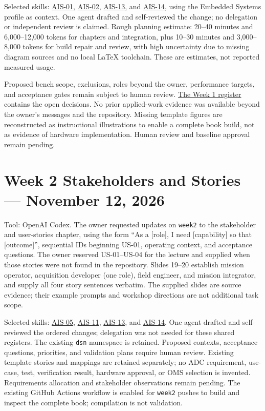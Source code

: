 Selected skills: \hyperref[Skill:AIS-01]{AIS-01},
\hyperref[Skill:AIS-02]{AIS-02}, \hyperref[Skill:AIS-13]{AIS-13}, and
\hyperref[Skill:AIS-14]{AIS-14}, using the Embedded Systems profile as context.
One agent drafted and self-reviewed the change; no delegation or independent
review is claimed. Rough planning estimate: 20--40 minutes and 6,000--12,000
tokens for chapters and integration, plus 10--30 minutes and 3,000--8,000
tokens for build repair and review, with high uncertainty due to missing
diagram sources and no local LaTeX toolchain. These are estimates, not
reported measured usage.

Proposed bench scope, exclusions, roles beyond the owner, performance targets,
and acceptance gates remain subject to human review.
\hyperref[Table:WeekOneTBDs]{The Week 1 register} contains the open decisions.
No prior applied-work evidence was available beyond the owner's messages
and the repository. Missing template figures are reconstructed as instructional
illustrations to enable a complete book build, not as evidence of hardware
implementation. Human review and baseline approval remain pending.

\section{Week 2 Stakeholders and Stories --- November 12, 2026}
\label{Section:WeekTwoStoryPromptRecord}
Tool: OpenAI Codex. The owner requested updates on \texttt{week2} to the
stakeholder and user-stories chapter, using the form ``As a [role], I need
[capability] so that [outcome]'', sequential IDs beginning US-01, operating
context, and acceptance questions. The owner reserved US-01--US-04 for the
lecture and supplied \cite{SPE800Week02} when those stories were not found
in the repository. Slides 19--20 establish mission operator, acquisition
developer (one role), field engineer, and mission integrator, and supply all
four story sentences verbatim. The supplied slides are source evidence;
their example prompts and workshop directions are not additional task scope.

Selected skills: \hyperref[Skill:AIS-05]{AIS-05},
\hyperref[Skill:AIS-11]{AIS-11}, \hyperref[Skill:AIS-13]{AIS-13}, and
\hyperref[Skill:AIS-14]{AIS-14}. One agent drafted and self-reviewed the
ordered changes; delegation was not needed for these shared registers.
The existing \texttt{dsn} namespace is retained. Proposed contexts, acceptance
questions, priorities, and validation plans require human review. Existing
template stories and mappings are retained separately; no ADC requirement,
use-case, test, verification result, hardware approval, or OMS selection is
invented. Requirements allocation and stakeholder observations remain pending.
The existing GitHub Actions workflow is enabled for \texttt{week2} pushes
to build and inspect the complete book; compilation is not validation.


